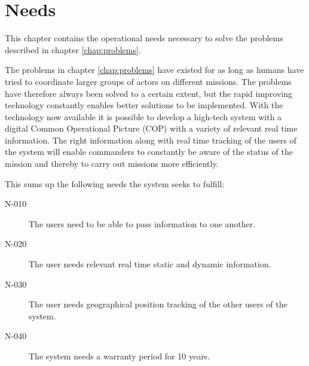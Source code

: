 \chapter{Needs}
This chapter contains the operational needs necessary to solve the problems described in chapter \ref{chap:problems}. 

The problems in chapter \ref{chap:problems} have existed for as long as humans have tried to coordinate larger groups of actors on different missions. The problems have therefore always been solved to a certain extent, but the rapid improving technology constantly enables better solutions to be implemented. With the technology now available it is possible to develop a high-tech system with a digital Common Operational Picture (COP) with a variety of relevant real time information. The right information along with real time tracking of the users of the system will enable commanders to constantly be aware of the status of the mission and thereby to carry out missions more efficiently. 

This sums up the following needs the system seeks to fulfill:

\begin{description}
\item[N-010] The users need to be able to pass information to one another. 
\item[N-020] The user needs relevant real time static and dynamic information. 
\item[N-030] The user needs geographical position tracking of the other users of the system.
\item[N-040] The system needs a warranty period for 10 years. 
\end{description}
	